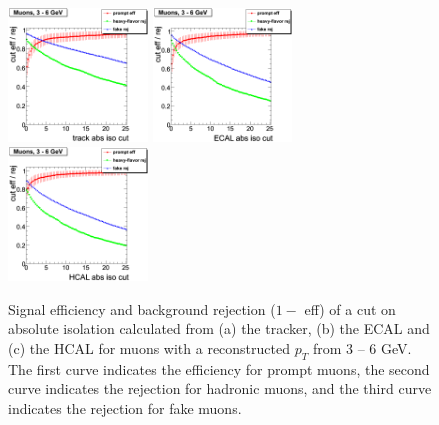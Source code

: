  \begin{figure}[htbp]
    \includegraphics[width = 0.33\textwidth]{pictures/absIsoCut_absIsoCutEff/absIsoCut_trackIso_cutEff_muon_ptCut0_ptCut1.png}
    \includegraphics[width = 0.33\textwidth]{pictures/absIsoCut_absIsoCutEff/absIsoCut_ecalIso_cutEff_muon_ptCut0_ptCut1.png}
    \includegraphics[width = 0.33\textwidth]{pictures/absIsoCut_absIsoCutEff/absIsoCut_hcalIso_cutEff_muon_ptCut0_ptCut1.png}
    \caption{Signal efficiency and background rejection ($1 - $ eff) of a cut on absolute isolation
       calculated from (a) the tracker, (b) the ECAL and (c) the HCAL for muons with a reconstructed
       $p_{T}$ from 3 -- 6 GeV. The first curve indicates the efficiency for prompt muons, the second
       curve indicates the rejection for hadronic muons, and the third curve indicates the rejection
       for fake muons.}
    \label{fig:AbsIsoCut_CutEffRej_Muon_PtCut0_PtCut1}
 \end{figure}

